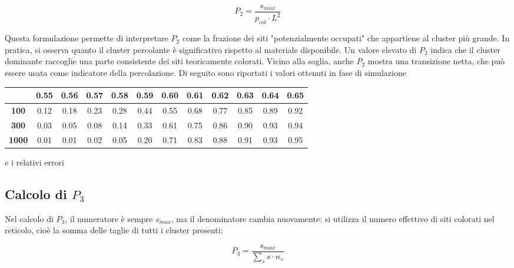 \vspace{4px}
\begin{equation}
P_2 = \frac{s_{max}}{p_{col} \cdot L^2}
\end{equation}

\vspace{4px}
\noindent
Questa formulazione permette di interpretare $P_2$ come la frazione dei siti "potenzialmente occupati" che appartiene al cluster più grande. In pratica, si osserva quanto il cluster percolante è significativo rispetto al materiale disponibile. Un valore elevato di $P_2$ indica che il cluster dominante raccoglie una parte consistente dei siti teoricamente colorati. Vicino alla soglia, anche $P_2$ mostra una transizione netta, che può essere usata come indicatore della percolazione. Di seguito sono riportati i valori ottenuti in fase di simulazione

\vspace{15px}
\noindent
\begin{tabular}{|c|*{11}{c|}}
	\hline
	\textbf{} & \textbf{0.55} & \textbf{0.56} & \textbf{0.57} & \textbf{0.58} & \textbf{0.59} & \textbf{0.60} & \textbf{0.61} & \textbf{0.62} & \textbf{0.63} & \textbf{0.64} & \textbf{0.65} \\
	\hline
	\textbf{100}  & 0.12 & 0.18 & 0.23 & 0.28 & 0.44 & 0.55 & 0.68 & 0.77 & 0.85 & 0.89 & 0.92 \\
	\hline
	\textbf{300}  & 0.03 & 0.05 & 0.08 & 0.14 & 0.33 & 0.61 & 0.75 & 0.86 & 0.90 & 0.93 & 0.94 \\
	\hline
	\textbf{1000} & 0.01 & 0.01 & 0.02 & 0.05 & 0.20 & 0.71 & 0.83 & 0.88 & 0.91 & 0.93 & 0.95 \\
	\hline
\end{tabular}

\vspace{15px}
\noindent
e i relativi errori

\subsection{Calcolo di $P_{3}$}

Nel calcolo di $P_3$, il numeratore è sempre $s_{max}$, ma il denominatore cambia nuovamente: si utilizza il numero effettivo di siti colorati nel reticolo, cioè la somma delle taglie di tutti i cluster presenti:

\begin{equation}
P_3 = \frac{s_{max}}{\sum_{s} s \cdot n_s}
\end{equation}

